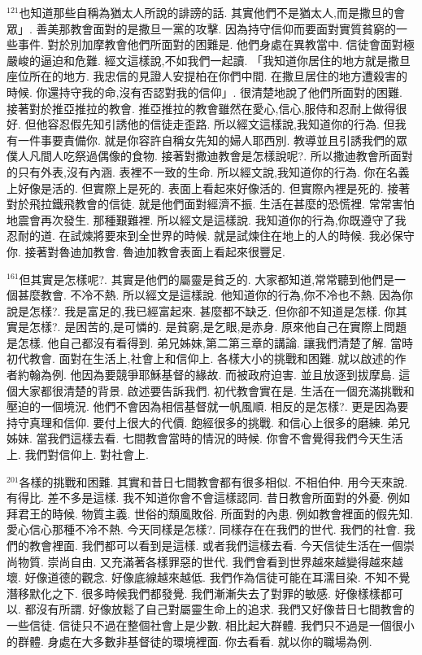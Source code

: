 \documentclass{book}
\begin{document}
$^{121}$也知道那些自稱為猶太人所說的誹謗的話.
其實他們不是猶太人,而是撒旦的會眾」.
善美那教會面對的是撒旦一黨的攻擊.
因為持守信仰而要面對實質貧窮的一些事件.
對於別加摩教會他們所面對的困難是.
他們身處在異教當中.
信徒會面對極嚴峻的逼迫和危難.
經文這樣說,不如我們一起讀.
「我知道你居住的地方就是撒旦座位所在的地方.
我忠信的見證人安提柏在你們中間.
在撒旦居住的地方遭殺害的時候.
你還持守我的命,沒有否認對我的信仰」.
很清楚地說了他們所面對的困難.
接著對於推亞推拉的教會.
推亞推拉的教會雖然在愛心,信心,服侍和忍耐上做得很好.
但他容忍假先知引誘他的信徒走歪路.
所以經文這樣說,我知道你的行為.
但我有一件事要責備你.
就是你容許自稱女先知的婦人耶西別.
教導並且引誘我們的眾僕人凡間人吃祭過偶像的食物.
接著對撒迪教會是怎樣說呢?.
所以撒迪教會所面對的只有外表,沒有內涵.
表裡不一致的生命.
所以經文說,我知道你的行為.
你在名義上好像是活的.
但實際上是死的.
表面上看起來好像活的.
但實際內裡是死的.
接著對於飛拉鐵飛教會的信徒.
就是他們面對經濟不振.
生活在甚麼的恐慌裡.
常常害怕地震會再次發生.
那種艱難裡.
所以經文是這樣說.
我知道你的行為,你既遵守了我忍耐的道.
在試煉將要來到全世界的時候.
就是試煉住在地上的人的時候.
我必保守你.
接著對魯迪加教會.
魯迪加教會表面上看起來很豐足.

$^{161}$但其實是怎樣呢?.
其實是他們的屬靈是貧乏的.
大家都知道,常常聽到他們是一個甚麼教會.
不冷不熱.
所以經文是這樣說.
他知道你的行為,你不冷也不熱.
因為你說是怎樣?.
我是富足的,我已經富起來.
甚麼都不缺乏.
但你卻不知道是怎樣.
你其實是怎樣?.
是困苦的,是可憐的.
是貧窮,是乞眼,是赤身.
原來他自己在實際上問題是怎樣.
他自己都沒有看得到.
弟兄姊妹,第二第三章的講論.
讓我們清楚了解.
當時初代教會.
面對在生活上,社會上和信仰上.
各樣大小的挑戰和困難.
就以啟述的作者約翰為例.
他因為要競爭耶穌基督的緣故.
而被政府迫害.
並且放逐到拔摩島.
這個大家都很清楚的背景.
啟述要告訴我們.
初代教會實在是.
生活在一個充滿挑戰和壓迫的一個境況.
他們不會因為相信基督就一帆風順.
相反的是怎樣?.
更是因為要持守真理和信仰.
要付上很大的代價.
飽經很多的挑戰.
和信心上很多的磨練.
弟兄姊妹.
當我們這樣去看.
七間教會當時的情況的時候.
你會不會覺得我們今天生活上.
我們對信仰上.
對社會上.

$^{201}$各樣的挑戰和困難.
其實和昔日七間教會都有很多相似.
不相伯仲.
用今天來說.
有得比.
差不多是這樣.
我不知道你會不會這樣認同.
昔日教會所面對的外憂.
例如拜君王的時候.
物質主義.
世俗的頹風敗俗.
所面對的內患.
例如教會裡面的假先知.
愛心信心那種不冷不熱.
今天同樣是怎樣?.
同樣存在在我們的世代.
我們的社會.
我們的教會裡面.
我們都可以看到是這樣.
或者我們這樣去看.
今天信徒生活在一個崇尚物質.
崇尚自由.
又充滿著各樣罪惡的世代.
我們會看到世界越來越變得越來越壞.
好像道德的觀念.
好像底線越來越低.
我們作為信徒可能在耳濡目染.
不知不覺潛移默化之下.
很多時候我們都發覺.
我們漸漸失去了對罪的敏感.
好像樣樣都可以.
都沒有所謂.
好像放鬆了自己對屬靈生命上的追求.
我們又好像昔日七間教會的一些信徒.
信徒只不過在整個社會上是少數.
相比起大群體.
我們只不過是一個很小的群體.
身處在大多數非基督徒的環境裡面.
你去看看.
就以你的職場為例.
\end{document}
